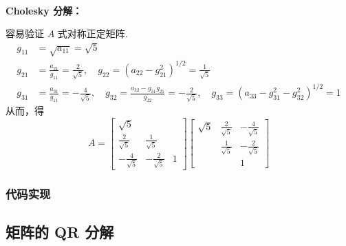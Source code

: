             \begin{solution}
                \\ \textbf{Cholesky 分解：}
                \par 容易验证 $A$ 式对称正定矩阵.
                \begin{align*}
                    g_{11} &= \sqrt{a_{11}} = \sqrt{5} \\
                    g_{21} &= \frac{a_{21}}{g_{11}} = \frac{2}{\sqrt{5}}, \quad g_{22} = (a_{22} - g_{21}^2)^{1/2} = \frac{1}{\sqrt{5}} \\
                    g_{31} &= \frac{a_{31}}{g_{11}} = -\frac{4}{\sqrt{5}}, \quad g_{32} = \frac{a_{32} - g_{31}g_{21}}{g_{22}} = -\frac{2}{\sqrt{5}}, \quad g_{33} = (a_{33} - g_{31}^2 - g_{32}^2)^{1/2} = 1
                \end{align*}
                从而，得
                \begin{equation*}
                    A = \begin{bmatrix}
                        \sqrt{5} & & \\ \frac{2}{\sqrt{5}} & \frac{1}{\sqrt{5}} \\ -\frac{4}{\sqrt{5}} & -\frac{2}{\sqrt{5}} & 1
                    \end{bmatrix}\begin{bmatrix}
                        \sqrt{5} & \frac{2}{\sqrt{5}} & -\frac{4}{\sqrt{5}} \\  & \frac{1}{\sqrt{5}} & -\frac{2}{\sqrt{5}} \\  &  & 1
                    \end{bmatrix}
                \end{equation*}
            \end{solution}

        \subsubsection{代码实现}
            

    \subsection{矩阵的 QR 分解}
